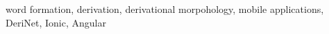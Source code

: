 \documentclass[a4paper,12pt,openany,twoside]{book} %
\begin{document}
word formation, derivation, derivational morpohology, mobile applications, DeriNet, Ionic, Angular

\clearpage

\tableofcontents


\cleardoublepage
{}









\clearpage

\pagestyle{plain}

\begin{spacing}{1.05}
\printbibliography[title={Seznam literatury}]
\end{spacing}
\end{document}
